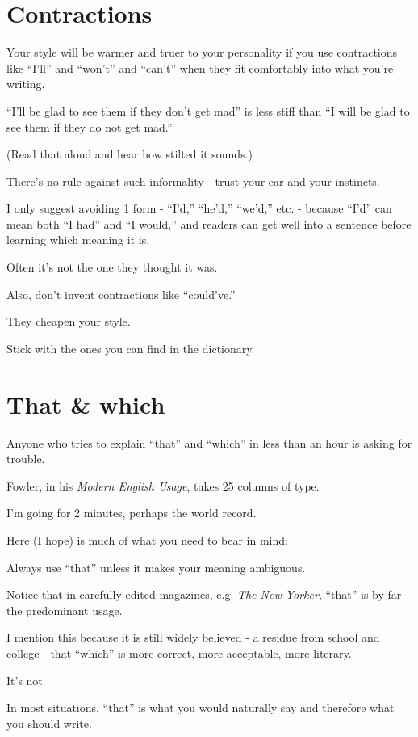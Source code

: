 \documentclass{book}
\numberwithin{equation}{section}
\begin{document}
\section{Contractions}
Your style will be warmer and truer to your personality if you use contractions like ``I'll'' and ``won't'' and ``can't'' when they fit comfortably into what you're writing.

``I'll be glad to see them if they don't get mad'' is less stiff than ``I will be glad to see them if they do not get mad.''

(Read that aloud and hear how stilted it sounds.)

There's no rule against such informality - trust your ear and your instincts.

I only suggest avoiding 1 form - ``I'd,'' ``he'd,'' ``we'd,'' etc. - because ``I'd'' can mean both ``I had'' and ``I would,'' and readers can get well into a sentence before learning which meaning it is.

Often it's not the one they thought it was.

Also, don't invent contractions like ``could've.''

They cheapen your style.

Stick with the ones you can find in the dictionary.

\section{That \& which}
Anyone who tries to explain ``that'' and ``which'' in less than an hour is asking for trouble.

Fowler, in his \textit{Modern English Usage}, takes 25 columns of type.

I'm going for 2 minutes, perhaps the world record.

Here (I hope) is much of what you need to bear in mind:

%
Always use ``that'' unless it makes your meaning ambiguous.

Notice that in carefully edited magazines, e.g. \textit{The New Yorker}, ``that'' is by far the predominant usage.

I mention this because it is still widely believed - a residue from school and college - that ``which'' is more correct, more acceptable, more literary.

It's not.

In most situations, ``that'' is what you would naturally say and therefore what you should write.
\end{document}
